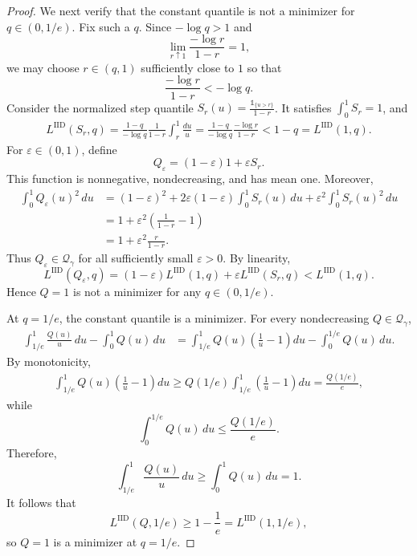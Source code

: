 \documentclass[10pt,a4paper]{amsart}
\newcommand{\LIID}{L^{\mathrm{IID}}}
\newcommand{\Qgam}{\mathcal{Q}_{\comp}}
\newcommand{\comp}{\gamma}
\newcommand{\ind}[1]{\mathds{1}_{\{#1\}}}
\begin{document}
\begin{proof}
We next verify that the constant quantile is not a minimizer for
$q\in(0,1/e)$. Fix such a $q$. Since $-\log q>1$ and
\begin{equation*}
    \lim_{r\uparrow1}\frac{-\log r}{1-r}=1,
\end{equation*}
we may choose $r\in(q,1)$ sufficiently close to $1$ so that
\begin{equation}\label{eq:iid_step_improvement_condition}
    \frac{-\log r}{1-r}<-\log q.
\end{equation}
Consider the normalized step quantile $S_r(u)=\frac{\ind{u>r}}{1-r}$.
It satisfies $\int_0^1S_r=1$, and
\begin{align*}
    \LIID(S_r,q)
    =
    \frac{1-q}{-\log q}
    \frac1{1-r}
    \int_r^1\frac{du}{u}
    =
    \frac{1-q}{-\log q}
    \frac{-\log r}{1-r}
    <
    1-q
    =
    \LIID(1,q).
\end{align*}
For $\varepsilon\in(0,1)$, define
\begin{equation*}
    Q_\varepsilon
    =
    (1-\varepsilon)1+\varepsilon S_r.
\end{equation*}
This function is nonnegative, nondecreasing, and has mean one.
Moreover,
\begin{align*}
    \int_0^1Q_\varepsilon(u)^2\,du
    &=
    (1-\varepsilon)^2
    +
    2\varepsilon(1-\varepsilon)\int_0^1S_r(u)\,du
    +
    \varepsilon^2\int_0^1S_r(u)^2\,du\\
    &=
    1+\varepsilon^2
    \left(\frac1{1-r}-1\right)\\
    &=
    1+\varepsilon^2\frac{r}{1-r}.
\end{align*}
Thus $Q_\varepsilon\in\Qgam$ for all sufficiently small
$\varepsilon>0$. By linearity,
\begin{equation*}
    \LIID(Q_\varepsilon,q)
    =
    (1-\varepsilon)\LIID(1,q)
    +
    \varepsilon\LIID(S_r,q)
    <
    \LIID(1,q).
\end{equation*}
Hence $Q=1$ is not a minimizer for any $q\in(0,1/e)$.


At $q=1/e$, the constant quantile is a minimizer. For every
nondecreasing $Q\in\Qgam$,
\begin{align*}
\int_{1/e}^1\frac{Q(u)}u\,du-\int_0^1Q(u)\,du
&=
\int_{1/e}^1Q(u)\left(\frac1u-1\right)du
-
\int_0^{1/e}Q(u)\,du.
\end{align*}
By monotonicity,
\begin{align*}
\int_{1/e}^1Q(u)\left(\frac1u-1\right)du
\geq
Q(1/e)\int_{1/e}^1\left(\frac1u-1\right)du
=
\frac{Q(1/e)}e,
\end{align*}
while
\begin{equation*}
\int_0^{1/e}Q(u)\,du
\leq
\frac{Q(1/e)}e.
\end{equation*}
Therefore,
\begin{equation*}
\int_{1/e}^1\frac{Q(u)}u\,du
\geq
\int_0^1Q(u)\,du
=
1.
\end{equation*}
It follows that
\begin{equation*}
\LIID(Q,1/e)
\geq
1-\frac1e
=
\LIID(1,1/e),
\end{equation*}
so $Q=1$ is a minimizer at $q=1/e$.




\end{proof}
\end{document}

